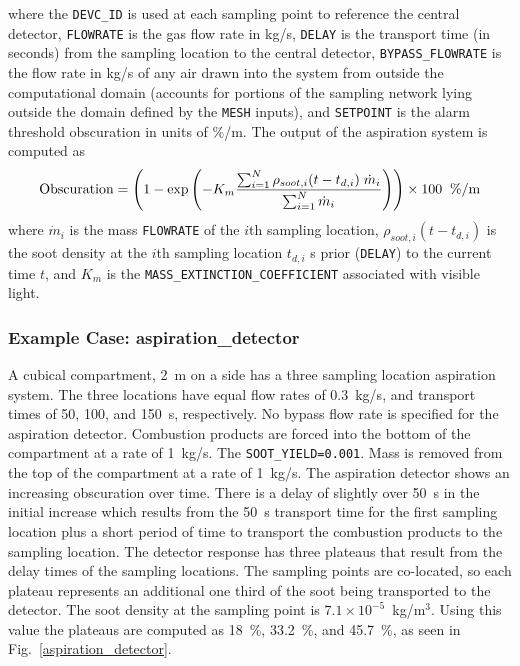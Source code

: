 \documentclass[11pt]{book}
\newcommand{\ct}{\tt\small}
\newcommand{\dm}{\dot{m}}
\newcommand{\be}{\begin{equation}}
\newcommand{\ee}{\end{equation}}
\begin{document}
\noindent
where the {\ct DEVC\_ID} is used at each sampling point to reference the central detector, {\ct FLOWRATE} is the gas
flow rate in kg/s, {\ct DELAY} is the transport time (in seconds) from the sampling location to the central detector,
{\ct BYPASS\_FLOWRATE} is the flow rate in kg/s of any air drawn into the system from outside the computational
domain (accounts for portions of the sampling network lying outside the domain defined by the {\ct MESH}
inputs), and {\ct SETPOINT} is the alarm threshold obscuration in units of \%/m. The output of the aspiration system is
computed as
\be
  \hbox{Obscuration}  = \left(1 - \exp \left( -K_m \frac {\sum_{i=1}^N {\rho_{soot,i}( t-t_{d,i}) \; \dm_i}} {\sum_{i=1}^N{ \dm_i} } \right)  \right) \times 100  \; \; \hbox{\%/m}
\ee
where $\dm_i$ is the mass {\ct FLOWRATE} of the $i$th sampling location, $\rho_{soot,i}( t-t_{d,i})$ is the soot density at
the $i$th sampling location $t_{d,i}$ s prior ({\ct DELAY}) to the current time $t$, and $K_m$ is the {\ct MASS\_EXTINCTION\_COEFFICIENT} associated with visible light.

\subsubsection{Example Case: aspiration\_detector}

A cubical compartment, 2~m on a side has a three
sampling location aspiration system.  The three locations
have equal flow rates of 0.3~kg/s, and
transport times of 50, 100, and 150~s, respectively.  No bypass flow rate is
specified for the aspiration detector.  Combustion products are forced into the bottom of the compartment at a rate of 1~kg/s. The {\ct SOOT\_YIELD=0.001}.
Mass is removed from the top of the compartment at a rate of 1~kg/s.
The aspiration detector shows an increasing obscuration over time.  There is a delay of slightly over 50~s in
the initial increase which results from the 50~s transport time for the first sampling location plus a short
period of time to transport the combustion products to the sampling location.  The detector response has three plateaus
that result from the delay times of the sampling locations.  The sampling points are co-located, so each plateau represents
an additional one third of the soot being transported to the detector.  The soot density at the sampling point is
$7.1 \times 10^{-5}$~kg/m$^3$.  Using this value the plateaus are computed as 18~\%, 33.2~\%, and 45.7~\%, as seen
in Fig.~\ref{aspiration_detector}.
\end{document}
